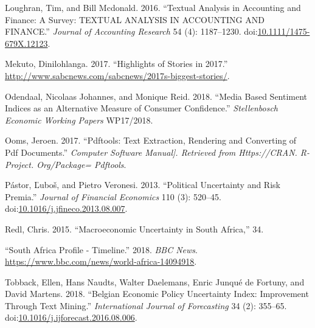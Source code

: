 \documentclass[11pt,preprint, authoryear]{elsarticle}
\numberwithin{equation}{section}
\numberwithin{figure}{section}
\numberwithin{table}{section}
\begin{document}
\hypertarget{ref-Loughran2016}{}
Loughran, Tim, and Bill Mcdonald. 2016. ``Textual Analysis in Accounting
and Finance: A Survey: TEXTUAL ANALYSIS IN ACCOUNTING AND FINANCE.''
\emph{Journal of Accounting Research} 54 (4): 1187--1230.
doi:\href{https://doi.org/10.1111/1475-679X.12123}{10.1111/1475-679X.12123}.

\hypertarget{ref-Mekuto2017}{}
Mekuto, Dinilohlanga. 2017. ``Highlights of Stories in 2017.''
\url{http://www.sabcnews.com/sabcnews/2017s-biggest-stories/}.

\hypertarget{ref-Odendaal2018}{}
Odendaal, Nicolaas Johannes, and Monique Reid. 2018. ``Media Based
Sentiment Indices as an Alternative Measure of Consumer Confidence.''
\emph{Stellenbosch Economic Working Papers} WP17/2018.

\hypertarget{ref-Ooms2017}{}
Ooms, Jeroen. 2017. ``Pdftools: Text Extraction, Rendering and
Converting of Pdf Documents.'' \emph{Computer Software Manual{]}.
Retrieved from Https://CRAN. R-Project. Org/Package= Pdftools}.

\hypertarget{ref-Pastor2013}{}
Pástor, Ľuboš, and Pietro Veronesi. 2013. ``Political Uncertainty and
Risk Premia.'' \emph{Journal of Financial Economics} 110 (3): 520--45.
doi:\href{https://doi.org/10.1016/j.jfineco.2013.08.007}{10.1016/j.jfineco.2013.08.007}.

\hypertarget{ref-Redl2015}{}
Redl, Chris. 2015. ``Macroeconomic Uncertainty in South Africa,'' 34.

\hypertarget{ref-2018}{}
``South Africa Profile - Timeline.'' 2018. \emph{BBC News}.
\url{https://www.bbc.com/news/world-africa-14094918}.

\hypertarget{ref-Tobback2018}{}
Tobback, Ellen, Hans Naudts, Walter Daelemans, Enric Junqué de Fortuny,
and David Martens. 2018. ``Belgian Economic Policy Uncertainty Index:
Improvement Through Text Mining.'' \emph{International Journal of
Forecasting} 34 (2): 355--65.
doi:\href{https://doi.org/10.1016/j.ijforecast.2016.08.006}{10.1016/j.ijforecast.2016.08.006}.

\newpage
\end{document}
